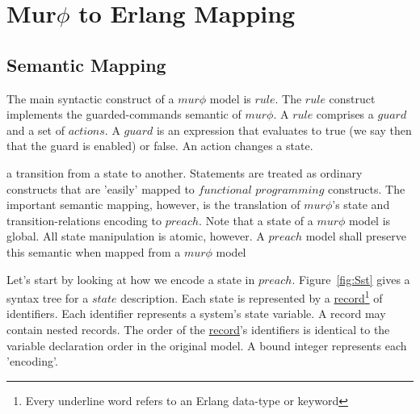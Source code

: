 \chapter{Mur$\phi$ to Erlang Mapping}

\section{Semantic Mapping}

The main syntactic construct of a $mur\phi$ model is $rule$. The $rule$ 
construct implements
the guarded-commands semantic of $mur\phi$. A $rule$ comprises a $guard$ and a set
of $actions$. A $guard$ is an expression that evaluates to true (we say then that the 
guard is enabled) or false. 
An action changes a state.

a transition from a state to another. Statements are treated as ordinary constructs
that are 'easily' mapped to $functional$ $programming$ constructs. The important
semantic mapping, however, is the translation of $mur\phi$'s state and 
transition-relations encoding to $preach$.
Note that a state of a $mur\phi$ model is global. All state manipulation is atomic, 
however.
A $preach$ model shall preserve this semantic when mapped from a $mur\phi$ model


Let's start by looking at how we encode a state in $preach$. Figure~\ref{fig:Sst} gives
a syntax tree for a $state$ description. Each state is represented by 
a \underline{record}\footnote{Every underline word refers to an Erlang data-type or
keyword} of identifiers.  Each identifier represents a system's state variable. A record may 
contain nested records.  The order of the \underline{record}'s identifiers is identical to 
the variable declaration order in the original model. A bound integer represents each 
'encoding'.

